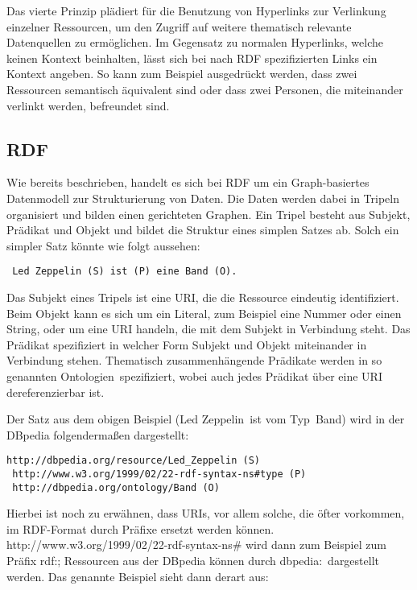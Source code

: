 Das vierte Prinzip plädiert für die Benutzung von Hyperlinks zur Verlinkung einzelner Ressourcen, um den Zugriff auf weitere thematisch relevante Datenquellen zu ermöglichen. Im Gegensatz zu normalen Hyperlinks, welche keinen Kontext beinhalten, lässt sich bei nach RDF spezifizierten Links ein Kontext angeben. So kann zum Beispiel ausgedrückt werden, dass zwei Ressourcen semantisch äquivalent sind oder dass zwei Personen, die miteinander verlinkt werden, befreundet sind.


\subsection{RDF}

Wie bereits beschrieben, handelt es sich bei RDF um ein Graph-basiertes Datenmodell zur Strukturierung von Daten. Die Daten werden dabei in Tripeln organisiert und bilden einen gerichteten Graphen. Ein Tripel besteht aus Subjekt, Prädikat und Objekt und bildet die Struktur eines simplen Satzes ab. Solch ein simpler Satz könnte wie folgt aussehen:

\begin{lstlisting}
 Led Zeppelin (S) ist (P) eine Band (O).
\end{lstlisting}


Das Subjekt eines Tripels ist eine URI, die die Ressource eindeutig identifiziert. Beim Objekt kann es sich um ein Literal, zum Beispiel eine Nummer oder einen String, oder um eine URI handeln, die mit dem Subjekt in Verbindung steht. Das Prädikat spezifiziert in welcher Form Subjekt und Objekt miteinander in Verbindung stehen. Thematisch zusammenhängende Prädikate werden in so genannten \glqq Ontologien\grqq \ spezifiziert, wobei auch jedes Prädikat über eine URI dereferenzierbar ist.

Der Satz aus dem obigen Beispiel (\glqq Led Zeppelin\grqq \ ist vom \glqq Typ\grqq \ \glqq Band\grqq) wird in der DBpedia folgendermaßen dargestellt\cite{dbpedia_led_zeppelin}:

\begin{lstlisting}
http://dbpedia.org/resource/Led_Zeppelin (S) 
 http://www.w3.org/1999/02/22-rdf-syntax-ns#type (P)
 http://dbpedia.org/ontology/Band (O)
\end{lstlisting}

Hierbei ist noch zu erwähnen, dass URIs, vor allem solche, die öfter vorkommen, im RDF-Format durch Präfixe ersetzt werden können. http://www.w3.org/1999/02/22-rdf-syntax-ns\# wird dann zum Beispiel zum Präfix \glqq rdf:\grqq; Ressourcen aus der DBpedia können durch \glqq dbpedia:\grqq \  dargestellt werden.
Das genannte Beispiel sieht dann derart aus:

